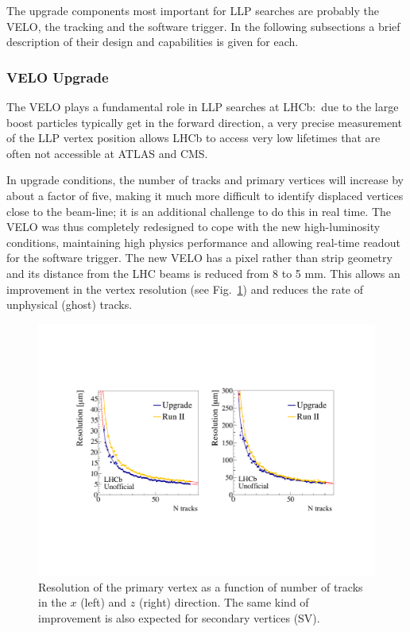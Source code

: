 The upgrade components most important for LLP searches are probably the  VELO, the tracking and the software trigger. In the following subsections a brief description of their design and capabilities is given for each.


\subsubsection{VELO Upgrade}
The VELO plays a fundamental role in LLP searches at LHCb:~due to the large boost particles typically get in the forward direction, a very precise measurement of the LLP vertex position allows LHCb to access very low lifetimes that are often not accessible at ATLAS and CMS.

In upgrade conditions, the number of tracks and primary vertices will increase by about a factor of five, making it much more difficult to identify displaced vertices close to the beam-line; it is an additional challenge to do this in real time.
The VELO was thus completely redesigned to cope with the new high-luminosity conditions, maintaining high physics performance and allowing real-time readout for the software trigger. The new VELO has a pixel rather than strip geometry and its distance from the LHC beams is reduced from 8 to 5 mm. This allows  an improvement in the vertex resolution (see Fig.~\ref{fig:ulhcb_pvres}) and reduces the rate of unphysical (ghost) tracks.

\begin{figure}[t]
\centerline{\includegraphics[width=\textwidth]{figures/lhcb_vertexres.pdf}}
  \caption{Resolution of the primary vertex as a function of number of tracks in the $x$ (left) and $z$ (right) direction. The same kind of improvement is also expected for secondary vertices (SV).}
  \label{fig:ulhcb_pvres}
\end{figure}


